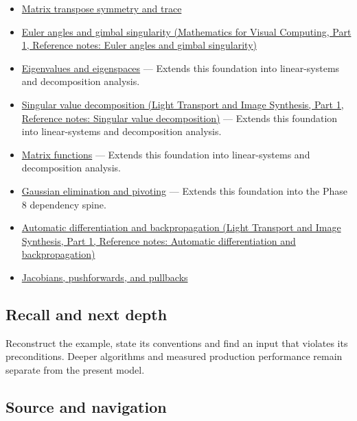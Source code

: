 \hypertarget{appendix-ab31ef447dbf-used-by}{}

\begin{itemize}
\item
  \hyperref[appendix-175ca5ff874d]{Matrix transpose symmetry and trace}
\item
  \href{../02-Mathematics-for-Visual-Computing-P01/main.pdf\#appendix-5f723fbd0593}{Euler angles and gimbal singularity (Mathematics for Visual Computing, Part 1, Reference notes: Euler angles and gimbal singularity)}
\item
  \hyperref[appendix-0b3be18411f9]{Eigenvalues and eigenspaces} --- Extends this foundation into linear-systems and decomposition analysis.
\item
  \href{../04-Light-Transport-and-Image-Synthesis-P01/main.pdf\#appendix-1fad5e7f36fa}{Singular value decomposition (Light Transport and Image Synthesis, Part 1, Reference notes: Singular value decomposition)} --- Extends this foundation into linear-systems and decomposition analysis.
\item
  \hyperref[appendix-0f4bc2bf2b1f]{Matrix functions} --- Extends this foundation into linear-systems and decomposition analysis.
\item
  \hyperref[appendix-f6e77f4a200f]{Gaussian elimination and pivoting} --- Extends this foundation into the Phase 8 dependency spine.
\item
  \href{../04-Light-Transport-and-Image-Synthesis-P01/main.pdf\#appendix-40df0855b4a7}{Automatic differentiation and backpropagation (Light Transport and Image Synthesis, Part 1, Reference notes: Automatic differentiation and backpropagation)}
\item
  \hyperref[appendix-d8a7ddb675eb]{Jacobians, pushforwards, and pullbacks}
\end{itemize}

\subsection{Recall and next depth}\label{appendix-ab31ef447dbf-recall-and-next-depth}

\hypertarget{appendix-ab31ef447dbf-recall-and-next-depth}{}

Reconstruct the example, state its conventions and find an input that violates its preconditions. Deeper algorithms and measured production performance remain separate from the present model.

\subsection{Source and navigation}\label{appendix-ab31ef447dbf-source-and-navigation}

